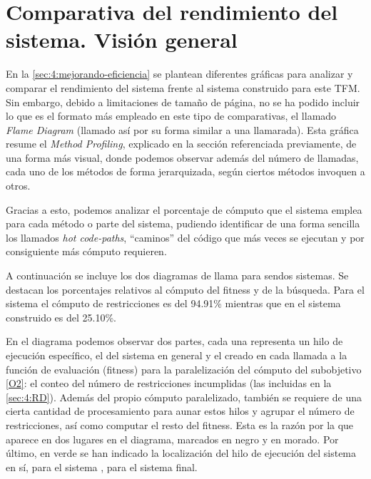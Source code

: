 \graphicspath{{anexos/AnexoC-Flame-Diagram/recursos/}}

\section{Comparativa del rendimiento del sistema. Visión general} \label{Anexo:flame-diagram}

En la \autoref{sec:4:mejorando-eficiencia} se plantean diferentes gráficas para analizar y comparar el rendimiento del sistema \legacy{} frente al sistema construido para este TFM. Sin embargo, debido a limitaciones de tamaño de página, no se ha podido incluir lo que es el formato más empleado en este tipo de comparativas, el llamado \textit{Flame Diagram} (llamado así por su forma similar a una llamarada). Esta gráfica resume el \textit{Method Profiling}, explicado en la sección referenciada previamente, de una forma más visual, donde podemos observar además del número de llamadas, cada uno de los métodos de forma jerarquizada, según ciertos métodos invoquen a otros.

Gracias a esto, podemos analizar el porcentaje de cómputo que el sistema emplea para cada método o parte del sistema, pudiendo identificar de una forma sencilla los llamados \textit{hot code-paths}, ``caminos'' del código que más veces se ejecutan y por consiguiente más cómputo requieren.

A continuación se incluye los dos diagramas de llama para sendos sistemas. Se destacan los porcentajes relativos al cómputo del fitness y de la búsqueda. Para el sistema \legacy{} el cómputo de restricciones es del 94.91\% mientras que en el sistema construido es del 25.10\%.

En el diagrama podemos observar dos partes, cada una representa un hilo de ejecución específico, el del sistema en general y el creado en cada llamada a la función de evaluación (fitness) para la paralelización del cómputo del subobjetivo \ref{O2}: el conteo del número de restricciones incumplidas (las incluidas en la \autoref{sec:4:RD}). Además del propio cómputo paralelizado, también se requiere de una cierta cantidad de procesamiento para aunar estos hilos y agrupar el número de restricciones, así como computar el resto del fitness. Esta es la razón por la que aparece en dos lugares en el diagrama, marcados en negro y en morado.
Por último, en verde se han indicado la localización del hilo de ejecución del sistema en sí, \sa{} para el sistema \legacy{}, \vns{} para el sistema final.

\begin{landscape}
	
\end{landscape}
